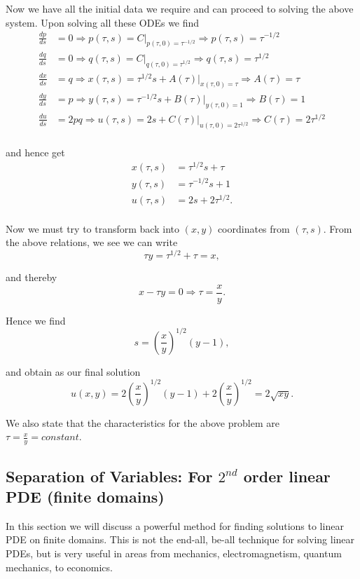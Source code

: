 Now we have all the initial data we require and can proceed to solving the above system. Upon solving all these ODEs we find
\begin{align*}
\frac{dp}{ds} &= 0 \Rightarrow p(\tau,s) = C\Big|_{p(\tau,0)=\tau^{-1/2}} \Rightarrow p(\tau,s) = \tau^{-1/2} \\
\frac{dq}{ds} &= 0 \Rightarrow q(\tau,s) = C\Big|_{q(\tau,0)=\tau^{1/2}} \Rightarrow q(\tau,s) = \tau^{1/2} \\
\frac{dx}{ds} &= q \Rightarrow x(\tau,s) = \tau^{1/2}s + A(\tau)\Big|_{x(\tau,0)=\tau} \Rightarrow A(\tau) = \tau  \\
\frac{dy}{ds} &= p \Rightarrow y(\tau,s) = \tau^{-1/2}s + B(\tau)\Big|_{y(\tau,0)=1} \Rightarrow B(\tau) = 1  \\
\frac{du}{ds} &= 2pq \Rightarrow  u(\tau,s) = 2s + C(\tau)\Big|_{u(\tau,0)=2\tau^{1/2}} \Rightarrow C(\tau) = 2\tau^{1/2} \\
\end{align*}

and hence get
\begin{align*}
x(\tau,s) &= \tau^{1/2} s + \tau \\
y(\tau,s) &= \tau^{-1/2}s + 1\\
u(\tau,s) &= 2s+2\tau^{1/2}.\\
\end{align*}

Now we must try to transform back into $(x,y)$ coordinates from $(\tau,s)$. From the above relations, we see we can write 
$$\tau y = \tau^{1/2}+\tau = x,$$

and thereby $$x -\tau y = 0 \Rightarrow \tau = \frac{x}{y}.$$

Hence we find $$s = \left(\frac{x}{y}\right)^{1/2}(y-1),$$

and obtain as our final solution $$u(x,y) = 2\left(\frac{x}{y}\right)^{1/2}(y-1) + 2\left( \frac{x}{y} \right)^{1/2} = 2\sqrt{xy}.$$

We also state that the characteristics for the above problem are $\tau = \frac{x}{y} = constant.$

%
%

\subsection{Separation of Variables: For $2^{nd}$ order linear PDE (finite domains)}

In this section we will discuss a powerful method for finding solutions to linear PDE on finite domains. This is not the end-all, be-all technique for solving linear PDEs, but is very useful in areas from mechanics, electromagnetism, quantum mechanics, to economics. \\


